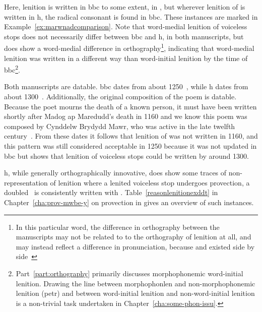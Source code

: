 Here,  lenition is written in \gls{bbc} to some extent, \eg in , but wherever lenition  of  is written in \gls{h}, the radical consonant is found in \gls{bbc}. These instances are marked in Example~\ref{ex:marwnadcomparison}. Note that word-medial lenition of voiceless stops does not necessarily differ between \gls{bbc} and \gls{h}, \cf {} in both manuscripts, but  does show a word-medial difference in orthography\footnote{In this particular word, the difference in orthography between the manuscripts may not be related to to the orthography of lenition at all, and may instead reflect a difference in pronunciation, because  and  existed side by side~\autocite[s.v.~\textit{cydymaith}]{bevan_geiriadur_2014}}, indicating that word-medial lenition was written in a different way than word-initial lenition by the time of \gls{bbc}\footnote{Part~\ref{part:orthography} primarily discusses morphophonemic word-initial lenition. Drawing the line between \gls{morphophonlen} and non-morphophonemic lenition (\gls{petr}) and between  word-initial lenition and non-word-initial lenition is a non-trivial task undertaken in Chapter~\ref{cha:some-phon-issu}.}.

Both manuscripts are datable. \Gls{bbc} dates from about 1250~\autocite[xxiv]{jones_rhagymadrodd_1982}, while \gls{h} dates from about 1300~\autocite{huws_llawysgrif_1981}. Additionally, the original composition of the poem is datable. Because the poet mourns the death of a known person, it must have been written shortly after Madog ap Maredudd's death in 1160 and we know this poem was composed by Cynddelw Brydydd Mawr, who was active in the late twelfth century~\autocite[xxx, 82]{jones_gwaith_1991}. From these dates it follows that lenition of  was  not written in 1160, and this pattern was still considered acceptable in 1250 because it was not updated in \gls{bbc} but \gls{} shows that lenition of voiceless stops could be written by around 1300.

\Gls{h}, while generally orthographically innovative, does show some traces of non-representation of lenition where a lenited voiceless stop undergoes provection, \ie a doubled \lT\ is consistently written with . Table~\ref{reasonlenitionexddt}   in Chapter~\ref{cha:prov-mwbe-y} on provection in  gives an overview of such instances.

